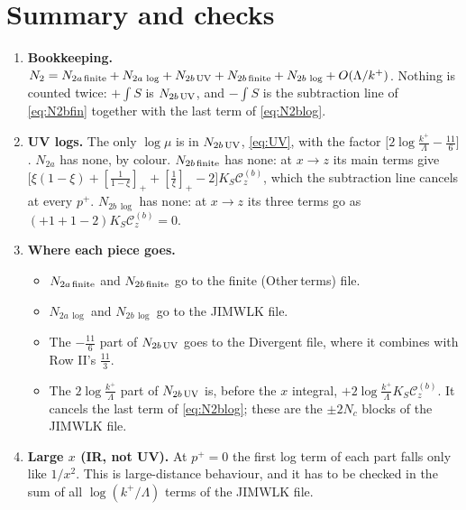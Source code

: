 \documentclass[10pt]{article}
\numberwithin{equation}{section}
\begin{document}
\section{Summary and checks}
\begin{enumerate}
\item \textbf{Bookkeeping.} $N_{2}=N_{2a\,\rm finite}+N_{2a\,\log}+N_{2b\,\rm UV}+N_{2b\,\rm finite}+N_{2b\,\log}+O(\Lambda/k^{+})$. Nothing is counted twice: $+\int S$ is $N_{2b\,\rm UV}$, and $-\int S$ is the subtraction line of \eqref{eq:N2bfin} together with the last term of \eqref{eq:N2blog}.
\item \textbf{UV logs.} The only $\log\mu$ is in $N_{2b\,\rm UV}$, \eqref{eq:UV}, with the factor $\big[2\log\frac{k^{+}}{\Lambda}-\frac{11}{6}\big]$. $N_{2a}$ has none, by colour. $N_{2b\,\rm finite}$ has none: at $x\to z$ its main terms give $\big[\xi(1-\xi)+[\frac{1}{1-\xi}]_{+}+[\frac1\xi]_{+}-2\big]K_{S}\mathcal{C}^{(b)}_{z}$, which the subtraction line cancels at every $p^{+}$. $N_{2b\,\log}$ has none: at $x\to z$ its three terms go as $(+1+1-2)K_{S}\mathcal{C}^{(b)}_{z}=0$.
\item \textbf{Where each piece goes.}
\begin{itemize}
\item $N_{2a\,\rm finite}$ and $N_{2b\,\rm finite}$ go to the finite (Other\,terms) file.
\item $N_{2a\,\log}$ and $N_{2b\,\log}$ go to the JIMWLK file.
\item The $-\frac{11}{6}$ part of $N_{2b\,\rm UV}$ goes to the Divergent file, where it combines with Row II's $\frac{11}{3}$.
\item The $2\log\frac{k^{+}}{\Lambda}$ part of $N_{2b\,\rm UV}$ is, before the $x$ integral, $+2\log\frac{k^{+}}{\Lambda}K_{S}\mathcal{C}^{(b)}_{z}$. It cancels the last term of \eqref{eq:N2blog}; these are the $\pm2N_{c}$ blocks of the JIMWLK file.
\end{itemize}
\item \textbf{Large $x$ (IR, not UV).} At $p^{+}=0$ the first log term of each part falls only like $1/x^{2}$. This is large-distance behaviour, and it has to be checked in the sum of all $\log(k^{+}/\Lambda)$ terms of the JIMWLK file.
\end{enumerate}
\end{document}
